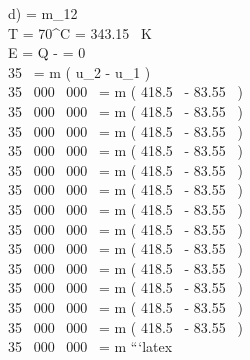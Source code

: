d) \quad {} \quad {} = \Delta m_{12} \\
T = 70^\circ C = 343.15 \, K \\
\Delta E = Q -  \quad {} = 0 \\
35 \,  = m \left( u_2 - u_1 \right) \\
35 \, 000 \, 000 \,  = m \left( 418.5 \,  - 83.55 \,  \right) \\
35 \, 000 \, 000 \,  = m \left( 418.5 \,  - 83.55 \,  \right) \\
35 \, 000 \, 000 \,  = m \left( 418.5 \,  - 83.55 \,  \right) \\
35 \, 000 \, 000 \,  = m \left( 418.5 \,  - 83.55 \,  \right) \\
35 \, 000 \, 000 \,  = m \left( 418.5 \,  - 83.55 \,  \right) \\
35 \, 000 \, 000 \,  = m \left( 418.5 \,  - 83.55 \,  \right) \\
35 \, 000 \, 000 \,  = m \left( 418.5 \,  - 83.55 \,  \right) \\
35 \, 000 \, 000 \,  = m \left( 418.5 \,  - 83.55 \,  \right) \\
35 \, 000 \, 000 \,  = m \left( 418.5 \,  - 83.55 \,  \right) \\
35 \, 000 \, 000 \,  = m \left( 418.5 \,  - 83.55 \,  \right) \\
35 \, 000 \, 000 \,  = m \left( 418.5 \,  - 83.55 \,  \right) \\
35 \, 000 \, 000 \,  = m \left( 418.5 \,  - 83.55 \,  \right) \\
35 \, 000 \, 000 \,  = m \left( 418.5 \,  - 83.55 \,  \right) \\
35 \, 000 \, 000 \,  = m \left```latex